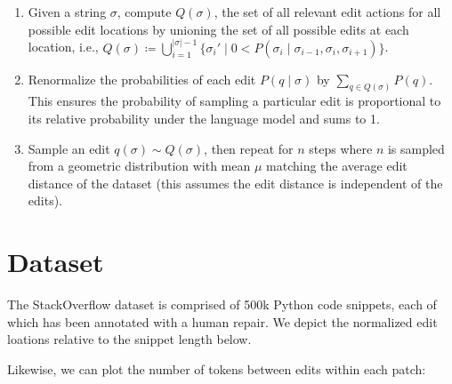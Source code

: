 \documentclass[runningheads]{llncs}
\begin{document}
\begin{enumerate}
  \item Given a string $\sigma$, compute $Q(\sigma)$, the set of all relevant edit actions for all possible edit locations by unioning the set of all possible edits at each location, i.e., $Q(\sigma) \coloneqq \bigcup_{i=1}^{|\sigma| - 1} \big\{\sigma_i' \mid  0 < P(\sigma_i \mid \sigma_{i-1}, \sigma_i, \sigma_{i+1})\big\}$.
  \item Renormalize the probabilities of each edit $P(q \mid \sigma)$ by $\sum_{q \in Q(\sigma)} P(q)$. This ensures the probability of sampling a particular edit is proportional to its relative probability under the language model and sums to 1.
  \item Sample an edit $q(\sigma) \sim Q(\sigma)$, then repeat for $n$ steps where $n$ is sampled from a geometric distribution with mean $\mu$ matching the average edit distance of the dataset (this assumes the edit distance is independent of the edits).
\end{enumerate}

\pagebreak\section{Dataset}

The StackOverflow dataset is comprised of 500k Python code snippets, each of which has been annotated with a human repair. We depict the normalized edit loations relative to the snippet length below.

\begin{figure}
\end{figure}

\noindent Likewise, we can plot the number of tokens between edits within each patch:
\end{document}
